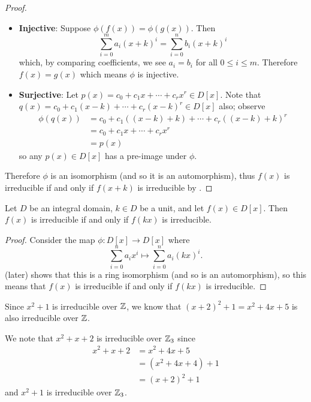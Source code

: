 \begin{proof}
\begin{itemize}
        \item \textbf{Injective}: Suppose $\phi(f(x)) = \phi(g(x))$. Then
        \[
            \sum_{i=0}^ma_i(x+k)^i = \sum_{i=0}^nb_i(x+k)^i
        \]
        which, by comparing coefficients, we see $a_i = b_i$ for all $0 \leq i \leq m$. Therefore $f(x) = g(x)$ which means $\phi$ is injective.

        \item \textbf{Surjective}: Let $p(x) = c_0 + c_1x + \cdots + c_rx^r \in D[x]$. Note that $q(x) = c_0 + c_1(x-k) + \cdots + c_r(x-k)^r \in D[x]$ also; observe
        \begin{align*}
            \phi(q(x)) &= c_0 + c_1((x-k)+k) + \cdots + c_r((x-k)+k)^r\\
            &= c_0 + c_1x + \cdots + c_rx^r\\
            &= p(x)
        \end{align*}
        so any $p(x) \in D[x]$ has a pre-image under $\phi$.
    \end{itemize}
    Therefore $\phi$ is an isomorphism (and so it is an automorphism), thus $f(x)$ is irreducible if and only if $f(x+k)$ is irreducible by .
\end{proof}

\begin{corollary}\label{corollary-irreducible-iff-constant-factor-multiple-is-irreducible}
    Let $D$ be an integral domain, $k \in D$ be a unit, and let $f(x) \in D[x]$. Then $f(x)$ is irreducible if and only if $f(kx)$ is irreducible.
\end{corollary}
\begin{proof}
    Consider the map $\phi: D[x] \to D[x]$ where
    \[
        \sum_{i=0}^n a_ix^i \mapsto \sum_{i=0}^na_i(kx)^i.
    \]
     (later) shows that this is a ring isomorphism (and so is an automorphism), so this means that $f(x)$ is irreducible if and only if $f(kx)$ is irreducible.
\end{proof}

\begin{example}
    Since $x^2 + 1$ is irreducible over $\mathbb{Z}$, we know that $(x+2)^2 + 1 = x^2 + 4x + 5$ is also irreducible over $\mathbb{Z}$.
\end{example}

\begin{example}
    We note that $x^2 + x + 2$ is irreducible over $\mathbb{Z}_3$ since
    \begin{align*}
        x^2 + x + 2 &= x^2 + 4x + 5\\
        &= (x^2 + 4x + 4) + 1\\
        &= (x+2)^2 + 1
    \end{align*}
    and $x^2 + 1$ is irreducible over $\mathbb{Z}_3$.
\end{example}

